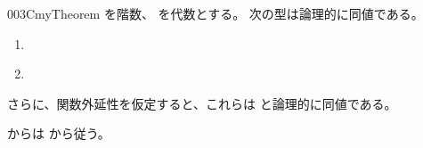 \documentclass[index]{subfiles}
\begin{document}
\begin{myBlock}{003C}{myTheorem}
  を階数、
  を\myInlineMath{\myNat}代数とする。
  次の型は論理的に同値である。
  \begin{enumerate}
  \item \label{003C:0000} 
  \item \label{003C:0001} 
  \end{enumerate}
  さらに、関数外延性を仮定すると、これらは
  と論理的に同値である。
\end{myBlock}
\begin{myProof}
  からは
  から従う。
\end{myProof}
\end{document}
